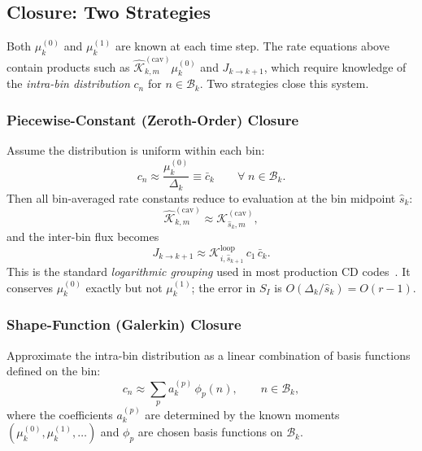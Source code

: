 \documentclass[pdflatex,sn-basic]{sn-jnl} %
\begin{document}
\subsection{Closure: Two Strategies}
\label{sec:closure}

Both $\mu_k^{(0)}$ and $\mu_k^{(1)}$ are known at each time step.
The rate equations above contain products such as
$\hat{\mathcal{K}}_{k,m}^{(\mathrm{cav})} \mu_k^{(0)}$ and
$J_{k\to k+1}$, which require knowledge of the \emph{intra-bin
distribution} $c_n$ for $n \in \mathcal{B}_k$. Two strategies
close this system.

\subsubsection{Piecewise-Constant (Zeroth-Order) Closure}
\label{sec:pc_closure}

Assume the distribution is uniform within each bin:
\begin{equation}\label{eq:pc_ansatz}
    c_n \approx \frac{\mu_k^{(0)}}{\Delta_k}
    \equiv \bar{c}_k
    \qquad \forall\; n \in \mathcal{B}_k.
\end{equation}
Then all bin-averaged rate constants reduce to evaluation at the bin
midpoint $\hat{s}_k$:
\begin{equation}\label{eq:Khat_pc}
    \hat{\mathcal{K}}_{k,m}^{(\mathrm{cav})}
    \approx \mathcal{K}_{\hat{s}_k,m}^{(\mathrm{cav})},
\end{equation}
and the inter-bin flux becomes
\begin{equation}\label{eq:Jkk1_pc}
    J_{k \to k+1}
    \approx \mathcal{K}_{i,\hat{s}_{k+1}}^{\mathrm{loop}}\,
            c_1\,\bar{c}_k.
\end{equation}
This is the standard \emph{logarithmic grouping} used in most
production CD codes~\cite{Golubov2001,Ovcharenko2003,Golubov2007,Kohnert2017,Cui2020}. It conserves
$\mu_k^{(0)}$ exactly but not $\mu_k^{(1)}$; the error in $S_I$ is
$O(\Delta_k/\hat{s}_k) = O(r-1)$.

\subsubsection{Shape-Function (Galerkin) Closure}
\label{sec:fem_closure}

Approximate the intra-bin distribution as a linear combination of
basis functions defined on the bin:
\begin{equation}\label{eq:shape_ansatz}
    c_n \approx \sum_{p} a_k^{(p)}\,\phi_p(n),
    \qquad n \in \mathcal{B}_k,
\end{equation}
where the coefficients $a_k^{(p)}$ are determined by the known
moments $(\mu_k^{(0)}, \mu_k^{(1)}, \ldots)$ and
$\phi_p$ are chosen basis functions on $\mathcal{B}_k$.
\end{document}
